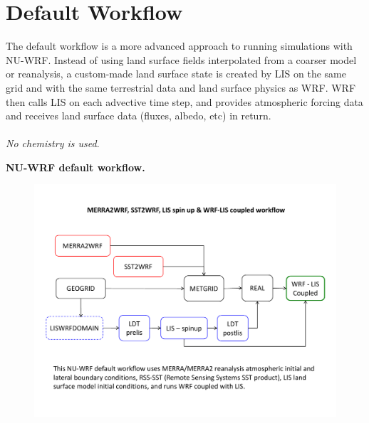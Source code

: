 \section{Default Workflow}

\begin{frame}

The default workflow is a more advanced approach to running simulations with NU-WRF. Instead of using land surface fields interpolated from a coarser model or reanalysis, a custom-made land surface state is created by LIS on the same grid and with the same terrestrial data and land surface physics as WRF. WRF  then calls LIS on each advective time step, and provides atmospheric forcing data and receives land surface data (fluxes, albedo, etc) in return.\\
\mbox{}\\
\emph{No chemistry is used}.
\mbox{}\\

\end{frame}



\begin{frame}

\centering
\textbf{NU-WRF default workflow.}
\begin{figure}[t]
\centering
\includegraphics[scale=.4]{default-workflow.pdf}
\end{figure}

\end{frame}


